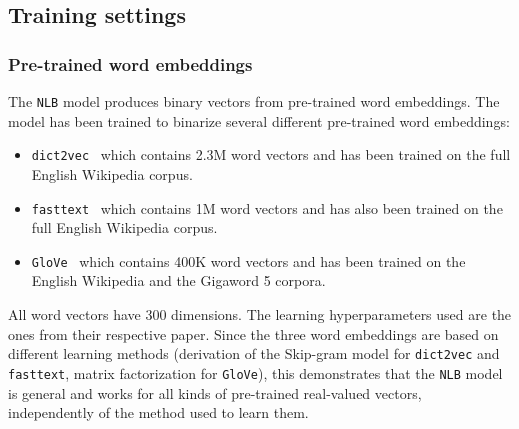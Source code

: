  \subsection{Training settings}
    \label{ch06:subsec:training-settings}
    \subsubsection{Pre-trained word embeddings}
      The \texttt{NLB} model produces binary vectors from pre-trained word
      embeddings. The model has been trained to binarize several different
      pre-trained word embeddings:

      \begin{itemize}
        \item \texttt{dict2vec}~\citep{tissier2017dict2vec} which contains 2.3M
          word vectors and has been trained on the full English Wikipedia
          corpus.
        \item \texttt{fasttext}~\citep{bojanowski2016enriching} which contains
          1M word vectors and has also been trained on the full English
          Wikipedia corpus.
        \item \texttt{GloVe}~\citep{pennington2014glove} which contains 400K
          word vectors and has been trained on the English Wikipedia and the
          Gigaword 5 corpora.
      \end{itemize}
      All word vectors have 300 dimensions. The learning hyperparameters used
      are the ones from their respective paper. Since the three word embeddings
      are based on different learning methods (derivation of the Skip-gram model
      for \texttt{dict2vec} and \texttt{fasttext}, matrix factorization for
      \texttt{GloVe}), this demonstrates that the \texttt{NLB} model is general
      and works for all kinds of pre-trained real-valued vectors, independently
      of the method used to learn them.

